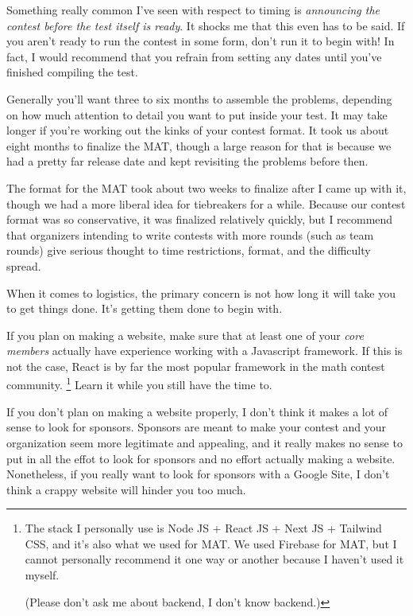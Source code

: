 \documentclass[points=false]{bounce}
\begin{document}
Something really common I've seen with respect to timing is \emph{announcing the contest before the test itself is ready}. It shocks me that this even has to be said. If you aren't ready to run the contest in some form, don't run it to begin with! In fact, I would recommend that you refrain from setting any dates until you've finished compiling the test.

Generally you'll want three to six months to assemble the problems, depending on how much attention to detail you want to put inside your test. It may take longer if you're working out the kinks of your contest format. It took us about eight months to finalize the MAT, though a large reason for that is because we had a pretty far release date and kept revisiting the problems before then.

The format for the MAT took about two weeks to finalize after I came up with it, though we had a more liberal idea for tiebreakers for a while. Because our contest format was so conservative, it was finalized relatively quickly, but I recommend that organizers intending to write contests with more rounds (such as team rounds) give serious thought to time restrictions, format, and the difficulty spread. 

When it comes to logistics, the primary concern is not how long it will take you to get things done. It's getting them done to begin with.

If you plan on making a website, make sure that at least one of your \emph{core members} actually have experience working with a Javascript framework.
If this is not the case, React is by far the most popular framework in the math contest community.
\footnote{The stack I personally use is Node JS + React JS + Next JS + Tailwind CSS, and it's also what we used for MAT. We used Firebase for MAT, but I cannot personally recommend it one way or another because I haven't used it myself.

(Please don't ask me about backend, I don't know backend.)}
Learn it while you still have the time to.

If you don't plan on making a website properly, I don't think it makes a lot of sense to look for sponsors.
Sponsors are meant to make your contest and your organization seem more legitimate and appealing,
and it really makes no sense to put in all the effot to look for sponsors and no effort actually making a website.
Nonetheless, if you really want to look for sponsors with a Google Site,
I don't think a crappy website will hinder you too much.
\end{document}
